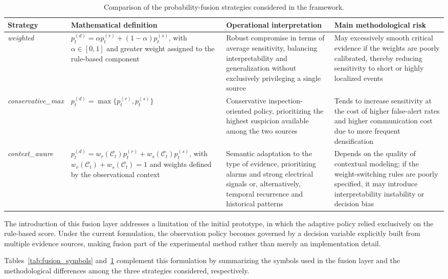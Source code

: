 \documentclass[journal]{IEEEtran}
\begin{document}
\begin{table}[ht]
\centering
\caption{Comparison of the probability-fusion strategies considered in the framework.}
\label{tab:fusion_strategies}
\begin{tabular}{p{2.0cm} p{4.2cm} p{4.4cm} p{4.6cm}}
\hline
\textbf{Strategy} & \textbf{Mathematical definition} & \textbf{Operational interpretation} & \textbf{Main methodological risk} \\
\hline
\textit{weighted} & $p_t^{(d)} = \alpha p_t^{(r)} + (1-\alpha)p_t^{(s)}$, with $\alpha \in [0,1]$ and greater weight assigned to the rule-based component & Robust compromise in terms of average sensitivity, balancing interpretability and generalization without exclusively privileging a single source & May excessively smooth critical evidence if the weights are poorly calibrated, thereby reducing sensitivity to short or highly localized events \\
\textit{conservative\_max} & $p_t^{(d)} = \max\{p_t^{(r)}, p_t^{(s)}\}$ & Conservative inspection-oriented policy, prioritizing the highest suspicion available among the two sources & Tends to increase sensitivity at the cost of higher false-alert rates and higher communication cost due to more frequent densification \\
\textit{context\_aware} & $p_t^{(d)} = w_r(\mathcal{C}_t)p_t^{(r)} + w_s(\mathcal{C}_t)p_t^{(s)}$, with $w_r(\mathcal{C}_t)+w_s(\mathcal{C}_t)=1$ and weights defined by the observational context & Semantic adaptation to the type of evidence, prioritizing alarms and strong electrical signals or, alternatively, temporal recurrence and historical patterns & Depends on the quality of contextual modeling; if the weight-switching rules are poorly specified, it may introduce interpretability instability or decision bias \\
\hline
\end{tabular}
\end{table}

The introduction of this fusion layer addresses a limitation of the initial prototype, in which the adaptive policy relied exclusively on the rule-based score. Under the current formulation, the observation policy becomes governed by a decision variable explicitly built from multiple evidence sources, making fusion part of the experimental method rather than merely an implementation detail.

Tables~\ref{tab:fusion_symbols} and~\ref{tab:fusion_strategies} complement this formulation by summarizing the symbols used in the fusion layer and the methodological differences among the three strategies considered, respectively.
\end{document}

